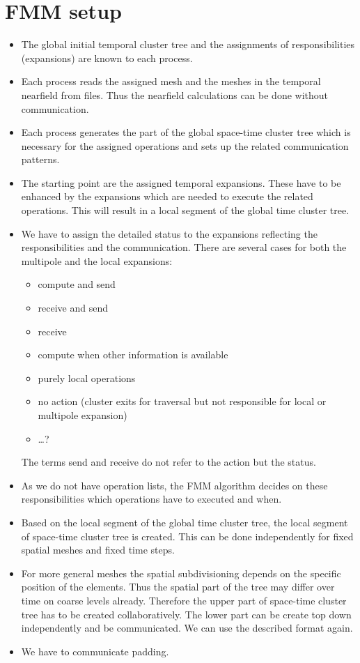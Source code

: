 \documentclass[a4paper]{scrartcl}
\begin{document}
\section{FMM setup}
\begin{itemize}
\item The global initial temporal cluster tree and the assignments of
  responsibilities (expansions)  are known to each process.
\item Each process reads the assigned mesh and the meshes in the temporal nearfield from
  files. Thus the nearfield calculations can be done without communication. 
\item Each process generates the part of the global space-time cluster tree
  which is necessary for the assigned operations and sets up the related
  communication patterns.
\item The starting point are the assigned temporal expansions. These have to be
  enhanced by the  expansions which are needed to execute the related
  operations. This will result in a local segment of the global time cluster tree.
\item We have to assign the detailed status to the expansions reflecting the
  responsibilities and the communication. There are several cases for both the
  multipole and the local expansions:
  \begin{itemize}
  \item compute and send
  \item receive and send
  \item receive 
  \item compute when other information is available
  \item purely local operations
  \item no action (cluster exits for traversal but not responsible for local or multipole expansion)
  \item \ldots ?
  \end{itemize}
  The terms send and receive do not refer to the action but the status.
  \item As we do not have operation lists, the FMM algorithm decides on these responsibilities
    which operations have to executed and when. 
\item Based on the local segment of the global time cluster tree, the local
  segment of space-time cluster tree is created. This can be done independently
  for fixed spatial meshes and fixed time steps.
\item For more general meshes the spatial subdivisioning depends on the
  specific position of the elements. Thus the spatial part of the tree may
  differ over time on coarse levels already. Therefore the upper part of
  space-time cluster tree has to be created collaboratively. The lower part can
  be create top down independently and be communicated. We can use the
  described format again. 
\item We have to communicate padding.
\end{itemize}
\end{document}
